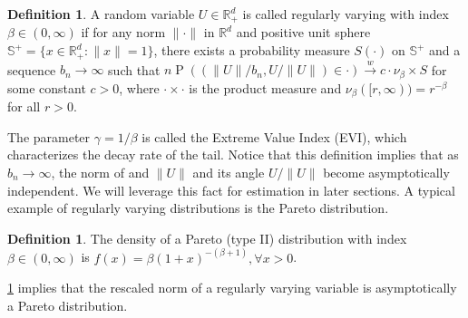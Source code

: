 \documentclass[12pt]{article}
\theoremstyle{plain}
\theoremstyle{definition}
\newtheorem{definition}[theorem]{Definition}
\newcommand{\tmop}[1]{\ensuremath{\operatorname{#1}}}
\begin{document}
\begin{definition} \label{def:mvarying}
  A random variable $U \in \mathbb{R}^d_+$ is called regularly varying with index $\beta \in (0, \infty)$ if for any norm $\| \cdot \|$ in
  $\mathbb{R}^d$ and positive unit sphere $\mathbb{S}^+ = \{ x \in
  \mathbb{R}^d_+ : \| x \| = 1 \}$, there exists a probability measure $S
  (\cdot)$ on $\mathbb{S}^+$ and a sequence $b_n \rightarrow \infty$ such that $n\tmop{P} ((\| U \| / b_n, U / \| U \|) \in \cdot) \overset{w}{\rightarrow} c \cdot \nu_{\beta} \times S$ for some constant $c > 0$, where $\cdot\times \cdot$ is the product measure and $\nu_{\beta} ([r, \infty)) = r^{-\beta}$ for all $r > 0$.
\end{definition}

The parameter $\gamma = 1/\beta$ is called the Extreme Value Index (EVI), which characterizes the decay rate of the tail. Notice that this definition implies that as $b_n \rightarrow \infty$, the norm of and $\| U \|$ and its angle $U / \| U \|$ become asymptotically independent. We will leverage this fact for estimation in later sections. A typical example of regularly varying distributions is the Pareto distribution.

\begin{definition}
  The density of a Pareto (type II) distribution with index $\beta \in (0, \infty)$ is $f (x) = \beta (1 + x)^{- (\beta + 1)}, \forall x > 0$.
\end{definition}

\cref{def:mvarying} implies that the rescaled norm of a regularly varying variable is asymptotically a Pareto distribution. 


\end{document}
